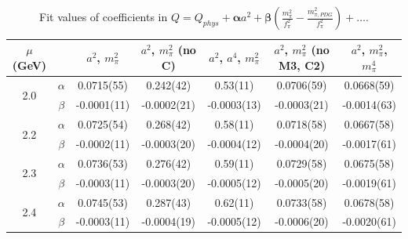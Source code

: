 \documentclass[12pt]{extarticle}
\begin{document}
\begin{table}[h!]
\begin{center}
\begin{tabular}{|c c|c|c|c|c|c|}
\hline
$\mu$ (GeV) &  & $a^2$, $m_\pi^2$& $a^2$, $m_\pi^2$ (no C)& $a^2$, $a^4$, $m_\pi^2$& $a^2$, $m_\pi^2$ (no M3, C2)& $a^2$, $m_\pi^2$, $m_\pi^4$\\
\hline
\multirow{2}{0.5in}{2.0} & $\alpha$ & 0.0715(55)& 0.242(42)& 0.53(11)& 0.0706(59)& 0.0668(59)\\
 & $\beta$ & -0.0001(11)& -0.0002(21)& -0.0003(13)& -0.0003(21)& -0.0014(63)\\
\hline
\multirow{2}{0.5in}{2.2} & $\alpha$ & 0.0725(54)& 0.268(42)& 0.58(11)& 0.0718(58)& 0.0667(58)\\
 & $\beta$ & -0.0002(11)& -0.0003(20)& -0.0004(12)& -0.0004(20)& -0.0017(61)\\
\hline
\multirow{2}{0.5in}{2.3} & $\alpha$ & 0.0736(53)& 0.276(42)& 0.59(11)& 0.0729(58)& 0.0675(58)\\
 & $\beta$ & -0.0003(11)& -0.0003(20)& -0.0005(12)& -0.0005(20)& -0.0019(61)\\
\hline
\multirow{2}{0.5in}{2.4} & $\alpha$ & 0.0745(53)& 0.287(43)& 0.62(11)& 0.0733(58)& 0.0678(58)\\
 & $\beta$ & -0.0003(11)& -0.0004(19)& -0.0005(12)& -0.0006(20)& -0.0020(61)\\
\hline
\end{tabular}
\caption{Fit values of coefficients in $Q = Q_{phys} + \mathbf{\alpha} a^2 + \mathbf{\beta}\left(\frac{m_\pi^2}{f_\pi^2}-\frac{m_{\pi,PDG}^2}{f_\pi^2}\right) + \ldots$.}
\end{center}
\end{table}




















\clearpage
\end{document}
